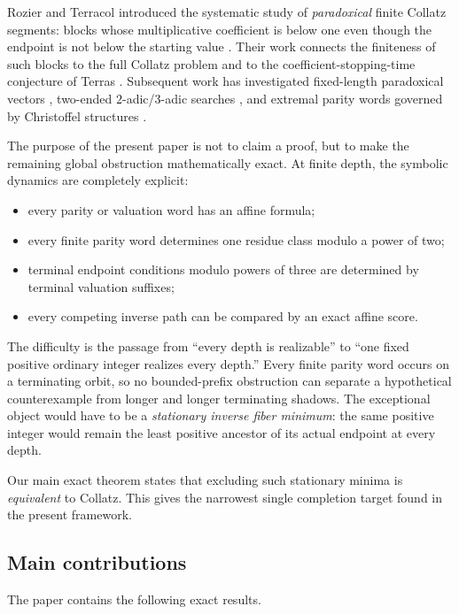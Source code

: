 \documentclass[11pt,reqno]{amsart}
\numberwithin{equation}{section}
\theoremstyle{definition}
\theoremstyle{remark}
\begin{document}
Rozier and Terracol introduced the systematic study of \emph{paradoxical}
finite Collatz segments: blocks whose multiplicative coefficient is below
one even though the endpoint is not below the starting value
\cite{RozierTerracol2025}.  Their work connects the finiteness of such blocks
to the full Collatz problem and to the coefficient-stopping-time conjecture
of Terras \cite{Terras1976}.  Subsequent work has investigated fixed-length
paradoxical vectors \cite{Niu2026}, two-ended $2$-adic/$3$-adic searches
\cite{Kramer2026}, and extremal parity words governed by Christoffel
structures \cite{FernandezIbanez2026}.

The purpose of the present paper is not to claim a proof, but to make the
remaining global obstruction mathematically exact.  At finite depth, the
symbolic dynamics are completely explicit:

\begin{itemize}[leftmargin=2em]
\item every parity or valuation word has an affine formula;
\item every finite parity word determines one residue class modulo a power of
      two;
\item terminal endpoint conditions modulo powers of three are determined by
      terminal valuation suffixes;
\item every competing inverse path can be compared by an exact affine score.
\end{itemize}

The difficulty is the passage from ``every depth is realizable'' to ``one
fixed positive ordinary integer realizes every depth.''  Every finite parity
word occurs on a terminating orbit, so no bounded-prefix obstruction can
separate a hypothetical counterexample from longer and longer terminating
shadows.  The exceptional object would have to be a \emph{stationary inverse
fiber minimum}: the same positive integer would remain the least positive
ancestor of its actual endpoint at every depth.

Our main exact theorem states that excluding such stationary minima is
\emph{equivalent} to Collatz.  This gives the narrowest single completion
target found in the present framework.

\subsection*{Main contributions}

The paper contains the following exact results.
\end{document}
